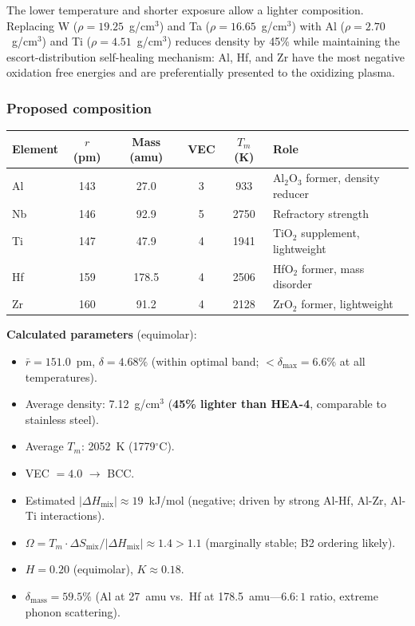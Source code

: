 \documentclass[12pt,letterpaper]{article}
\theoremstyle{definition}
\begin{document}
The lower temperature and shorter exposure allow a lighter composition.  Replacing W ($\rho = 19.25$~g/cm$^3$) and Ta ($\rho = 16.65$~g/cm$^3$) with Al ($\rho = 2.70$~g/cm$^3$) and Ti ($\rho = 4.51$~g/cm$^3$) reduces density by 45\% while maintaining the escort-distribution self-healing mechanism: Al, Hf, and Zr have the most negative oxidation free energies and are preferentially presented to the oxidizing plasma.

\subsubsection{Proposed composition}

\begin{center}
\begin{tabular}{@{}lccccl@{}}
\toprule
Element & $r$ (pm) & Mass (amu) & VEC & $T_m$ (K) & Role \\
\midrule
Al & 143 & 27.0 & 3 & 933 & Al$_2$O$_3$ former, density reducer \\
Nb & 146 & 92.9 & 5 & 2750 & Refractory strength \\
Ti & 147 & 47.9 & 4 & 1941 & TiO$_2$ supplement, lightweight \\
Hf & 159 & 178.5 & 4 & 2506 & HfO$_2$ former, mass disorder \\
Zr & 160 & 91.2 & 4 & 2128 & ZrO$_2$ former, lightweight \\
\bottomrule
\end{tabular}
\end{center}

\textbf{Calculated parameters} (equimolar):
\begin{itemize}
  \item $\bar{r} = 151.0$~pm, \quad $\delta = 4.68\%$ \quad (within optimal band; $< \delta_{\max} = 6.6\%$ at all temperatures).
  \item Average density: 7.12~g/cm$^3$ \quad (\textbf{45\% lighter than HEA-4}, comparable to stainless steel).
  \item Average $T_m$: 2052~K (1779$^\circ$C).
  \item VEC $= 4.0$ $\to$ BCC.
  \item Estimated $|\Delta H_{\mathrm{mix}}| \approx 19$~kJ/mol (negative; driven by strong Al-Hf, Al-Zr, Al-Ti interactions).
  \item $\Omega = T_m \cdot \Delta S_{\mathrm{mix}} / |\Delta H_{\mathrm{mix}}| \approx 1.4 > 1.1$ \quad (marginally stable; B2 ordering likely).
  \item $H = 0.20$ (equimolar), \quad $K \approx 0.18$.
  \item $\delta_{\mathrm{mass}} = 59.5\%$ \quad (Al at 27~amu vs.\ Hf at 178.5~amu---$6.6:1$ ratio, extreme phonon scattering).
\end{itemize}
\end{document}
